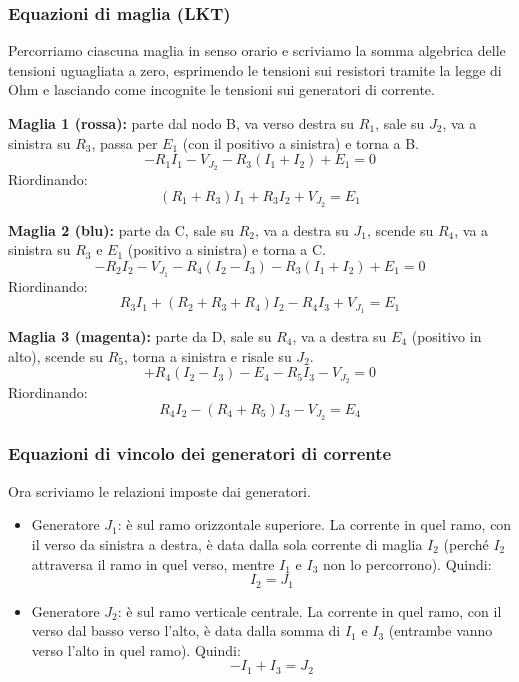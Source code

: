 \subsubsection{Equazioni di maglia (LKT)}

Percorriamo ciascuna maglia in senso orario e scriviamo la somma algebrica delle tensioni uguagliata a zero, esprimendo le tensioni sui resistori tramite la legge di Ohm e lasciando come incognite le tensioni sui generatori di corrente.

\textbf{Maglia 1 (rossa):} parte dal nodo B, va verso destra su \(R_1\), sale su \(J_2\), va a sinistra su \(R_3\), passa per \(E_1\) (con il positivo a sinistra) e torna a B.
\[
- R_1 I_1 - V_{J_2} - R_3(I_1 + I_2) + E_1 = 0
\]
Riordinando:
\begin{equation}
(R_1 + R_3) I_1 + R_3 I_2 + V_{J_2} = E_1
\label{eq:maglia1}
\end{equation}

\textbf{Maglia 2 (blu):} parte da C, sale su \(R_2\), va a destra su \(J_1\), scende su \(R_4\), va a sinistra su \(R_3\) e \(E_1\) (positivo a sinistra) e torna a C.
\[
- R_2 I_2 - V_{J_1} - R_4(I_2 - I_3) - R_3(I_1 + I_2) + E_1 = 0
\]
Riordinando:
\begin{equation}
R_3 I_1 + (R_2 + R_3 + R_4) I_2 - R_4 I_3 + V_{J_1} = E_1
\label{eq:maglia2}
\end{equation}

\textbf{Maglia 3 (magenta):} parte da D, sale su \(R_4\), va a destra su \(E_4\) (positivo in alto), scende su \(R_5\), torna a sinistra e risale su \(J_2\).
\[
+ R_4(I_2 - I_3) - E_4 - R_5 I_3 - V_{J_2} = 0
\]
Riordinando:
\begin{equation}
R_4 I_2 - (R_4 + R_5) I_3 - V_{J_2} = E_4
\label{eq:maglia3}
\end{equation}

\subsubsection{Equazioni di vincolo dei generatori di corrente}

Ora scriviamo le relazioni imposte dai generatori.

\begin{itemize}
    \item Generatore \(J_1\): è sul ramo orizzontale superiore. La corrente in quel ramo, con il verso da sinistra a destra, è data dalla sola corrente di maglia \(I_2\) (perché \(I_2\) attraversa il ramo in quel verso, mentre \(I_1\) e \(I_3\) non lo percorrono). Quindi:
    \begin{equation}
    I_2 = J_1
    \label{eq:vincoloJ1}
    \end{equation}
    \item Generatore \(J_2\): è sul ramo verticale centrale. La corrente in quel ramo, con il verso dal basso verso l’alto, è data dalla somma di \(I_1\) e \(I_3\) (entrambe vanno verso l’alto in quel ramo). Quindi:
    \begin{equation}
    - I_1 + I_3 = J_2
    \label{eq:vincoloJ2}
    \end{equation}
\end{itemize}

